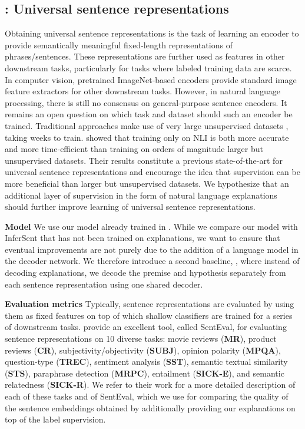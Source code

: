 \subsection{\expthree{}: Universal sentence representations}

Obtaining universal sentence representations is the task of learning an encoder to provide semantically meaningful fixed-length representations of phrases/sentences. 
These representations are further used as features in other downstream tasks, particularly for tasks where labeled training data are scarce. 
In computer vision, pretrained ImageNet-based encoders \cite{imagenet} provide standard image feature extractors for other downstream tasks. 
However, in natural language processing, there is still no consensus on general-purpose sentence encoders. 
It remains an open question on which task and dataset should such an encoder be trained. Traditional approaches make use of very large unsupervised datasets \cite{skip, fastsent}, taking weeks to train. 
\citet{infersent} showed that training only on NLI is both more accurate and more time-efficient than training on orders of magnitude larger but unsupervised datasets. Their results constitute a previous state-of-the-art for universal sentence representations and encourage the idea that supervision can be more beneficial than larger but unsupervised datasets. We hypothesize that an additional layer of supervision in the form of natural language explanations should further improve learning of universal sentence representations. 


\textbf{Model   } We use our \eInferSent{} model already trained in \expone. While we compare our model with InferSent that has not been trained on explanations, we want to ensure that eventual improvements are not purely due to the addition of a language model in the decoder network. 
We therefore introduce a second baseline, \inferSentAutoencoder, where instead of decoding explanations, we decode the premise and hypothesis separately from each sentence representation using one shared decoder.


\textbf{Evaluation metrics   }
Typically, sentence representations are evaluated by using them as fixed features on top of which shallow classifiers are trained for a series of downstream tasks. \citet{infersent} provide an excellent tool, called SentEval, for evaluating sentence representations on 10 diverse tasks: movie reviews ({\bf MR}), product reviews ({\bf CR}), subjectivity/objectivity ({\bf SUBJ}), opinion polarity ({\bf MPQA}), question-type ({\bf TREC}), sentiment analysis ({\bf SST}), semantic textual similarity ({\bf STS}), paraphrase detection ({\bf MRPC}), entailment ({\bf SICK-E}), and semantic relatedness ({\bf SICK-R}). 
We refer to their work for a more detailed description of each of these tasks and of SentEval, which we use for comparing the quality of the sentence embeddings obtained by additionally providing our explanations on top of the label supervision. 


